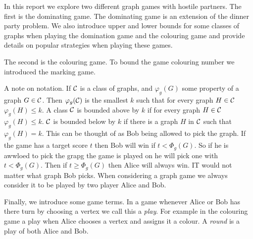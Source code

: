 In this report %
we explore two different graph games with hostile partners. The first is the dominating game. The dominating game is an extension of the dinner party problem.  We also introduce upper and lower bounds for some classes of graphs when playing the domination game and the colouring game and provide details on popular strategies when playing these games.

The second is the colouring game. To bound the game colouring number we introduced the marking game. 




  
    
A note on notation. If $\mathcal{C}$ is a class of graphs, and $\varphi_g(G)$ some property of a graph $G \in \mathcal{C}$. Then $\varphi_g(\mathcal{C})$ is the smallest $k$ such that for every graph $H\in\mathcal{C}$ $\varphi_g(H)\leq k$. A class $\mathcal{C}$ is bounded above by $k$ if for every graph $H\in\mathcal{C}$ $\varphi_g(H)\leq k$. $\mathcal{C}$ is bounded below by $k$ if there is a graph $H$ in $\mathcal{C}$ such that $\varphi_g(H)= k$. This can be thought of as Bob being allowed to pick the graph. If the game has a target score $t$ then Bob will win if $t < \varPhi_g(G)$. So if he is awwloed to pick the grapg the game is played on he will pick one with $t < \varPhi_g(G)$. Then if $t\geq \varPhi_g(G)$ then Alice will always win. IT would not matter what graph Bob picks. When considering a graph game we always consider it to be played by two player Alice and Bob.  

Finally, we introduce some game terms. In a game whenever Alice or Bob has there turn by choosing a vertex we call this a \textit{play}. For example in the colouring game a play when Alice chooses a vertex and assigns it a colour. A \textit{round} is a play of both Alice and Bob.  %


    
    
    
    
    
    
    
    
    
    
    
    
    
    
    
    
    
    
    
    